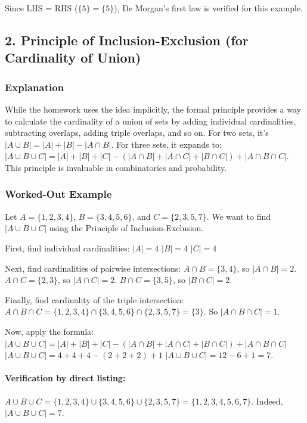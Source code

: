 \documentclass{article}
\begin{document}
\begin{itemize}
\begin{itemize}
\begin{itemize}
\begin{enumerate}
\begin{itemize}
Since LHS = RHS ($ \{5\} = \{5\} $), De Morgan's first law is verified for this example.

\subsection{2. Principle of Inclusion-Exclusion (for Cardinality of Union)}
\subsubsection*{Explanation}
While the homework uses the idea implicitly, the formal principle provides a way to calculate the cardinality of a union of sets by adding individual cardinalities, subtracting overlaps, adding triple overlaps, and so on. For two sets, it's $|A \cup B| = |A| + |B| - |A \cap B|$. For three sets, it expands to:
$|A \cup B \cup C| = |A| + |B| + |C| - (|A \cap B| + |A \cap C| + |B \cap C|) + |A \cap B \cap C|$.
This principle is invaluable in combinatorics and probability.

\subsubsection*{Worked-Out Example}
Let $A = \{1, 2, 3, 4\}$, $B = \{3, 4, 5, 6\}$, and $C = \{2, 3, 5, 7\}$.
We want to find $|A \cup B \cup C|$ using the Principle of Inclusion-Exclusion.

First, find individual cardinalities:
$|A| = 4$
$|B| = 4$
$|C| = 4$

Next, find cardinalities of pairwise intersections:
$A \cap B = \{3, 4\}$, so $|A \cap B| = 2$.
$A \cap C = \{2, 3\}$, so $|A \cap C| = 2$.
$B \cap C = \{3, 5\}$, so $|B \cap C| = 2$.

Finally, find cardinality of the triple intersection:
$A \cap B \cap C = \{1, 2, 3, 4\} \cap \{3, 4, 5, 6\} \cap \{2, 3, 5, 7\} = \{3\}$.
So $|A \cap B \cap C| = 1$.

Now, apply the formula:
$|A \cup B \cup C| = |A| + |B| + |C| - (|A \cap B| + |A \cap C| + |B \cap C|) + |A \cap B \cap C|$
$|A \cup B \cup C| = 4 + 4 + 4 - (2 + 2 + 2) + 1$
$|A \cup B \cup C| = 12 - 6 + 1 = 7$.

\paragraph*{Verification by direct listing:}
$A \cup B \cup C = \{1, 2, 3, 4\} \cup \{3, 4, 5, 6\} \cup \{2, 3, 5, 7\} = \{1, 2, 3, 4, 5, 6, 7\}$.
Indeed, $|A \cup B \cup C| = 7$.


\end{itemize}
\end{enumerate}
\end{itemize}
\end{itemize}
\end{itemize}
\end{document}

